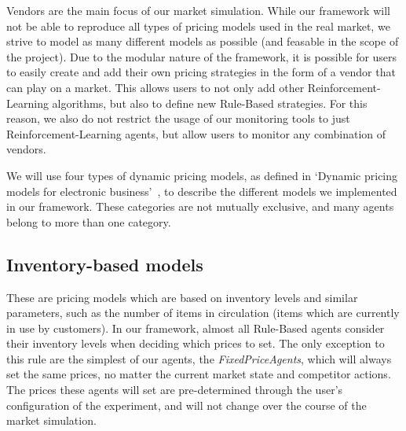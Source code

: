 Vendors are the main focus of our market simulation. While our framework will not be able to reproduce all types of pricing models used in the real market, we strive to model as many different models as possible (and feasable in the scope of the project). Due to the modular nature of the framework, it is possible for users to easily create and add their own pricing strategies in the form of a vendor that can play on a market. This allows users to not only add other Reinforcement-Learning algorithms, but also to define new Rule-Based strategies. For this reason, we also do not restrict the usage of our monitoring tools to just Reinforcement-Learning agents, but allow users to monitor any combination of vendors.

We will use four types of dynamic pricing models, as defined in `Dynamic pricing models for electronic business'~\cite{dynamicPricingModels}, to describe the different models we implemented in our framework. These categories are not mutually exclusive, and many agents belong to more than one category.

\subsection*{Inventory-based models}\label{subsec:InventoryBasedModels}

These are pricing models which are based on inventory levels and similar parameters, such as the number of items in circulation (items which are currently in use by customers). In our framework, almost all Rule-Based agents consider their inventory levels when deciding which prices to set. The only exception to this rule are the simplest of our agents, the \emph{FixedPriceAgents}, which will always set the same prices, no matter the current market state and competitor actions. The prices these agents will set are pre-determined through the user's configuration of the experiment, and will not change over the course of the market simulation.

